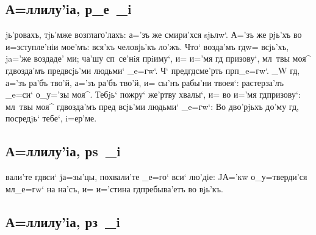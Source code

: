 \documentclass[12pt,a6paper,twoside,dvips,civil=antiqua,cs=pochaev]{hipbook}
\begin{document}
\slava

\delimpict

\subsection{А=ллилу'iа, р_е~_i}

jь'ровахъ, тjь'мже возглаго'лахъ: а='зъ же сми\-ри'х\-ся
sjь\-лw`. А='зъ же рjь'хъ во и=з\-ступ\-ле'нiи мо\-е'мъ: вся'къ
че\-ло\-вjь'къ ло'жъ. Что` возда'мъ гд w= всjь'хъ, ja='же
воз\-да\-де' ми; ча'шу сп~се'нiя прi\-иму`, и= и='мя гд
при\-зо\-ву`, мл~твы моя^ гд воз\-да'мъ пред\ъ всjь'\-ми людьми`
_e=гw`. Ч` пред\ъ гд сме'рть прп _e=гw`. _W гд,
а='зъ ра'бъ тво'й, а='зъ ра'бъ тво'й, и= сы'нъ рабы'ни тво\-ея`:
рас\-тер\-за'лъ _e=си` о_у='зы моя^. Тебjь` пожру` же'р\-тву хвалы`,
и= во и='мя гд при\-зову`: мл~твы моя^ гд возда'мъ пред\ъ
всjь'\-ми людь\-ми` _e=гw`: Во дво'рjьхъ до'му гд, по\-сре\-дjь`
тебе`, i=ер'\-ме.

\delimpict

\subsection{А=ллилу'iа, рs~_i}

вали'те гд вси` jа=зы'цы, похвали'те _е=го` вси` лю'дiе: JА='кw
о_у=тверди'ся мл _е=гw` на на'съ, и= и='стина гд пребыва'етъ во
вjь'къ.

\delimpict

\subsection{А=ллилу'iа, рз~_i}
\end{document}
